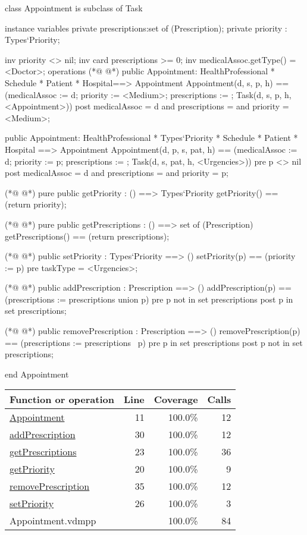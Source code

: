 \begin{vdmpp}[breaklines=true]
class Appointment is subclass of Task

instance variables
  private prescriptions:set of (Prescription);
  private priority : Types`Priority;
  
  inv priority <> nil;
  inv card prescriptions >= 0;
  inv medicalAssoc.getType() = <Doctor>;
operations
(*@
\label{Appointment:11}
@*)
 public Appointment: HealthProfessional * Schedule * Patient * Hospital==> Appointment
  Appointment(d, s, p, h) == (medicalAssoc := d; priority := <Medium>; prescriptions := {}; Task(d, s, p, h, <Appointment>))
 post medicalAssoc = d and prescriptions = {} and priority = <Medium>;
 
 public Appointment: HealthProfessional * Types`Priority * Schedule * Patient * Hospital ==> Appointment
  Appointment(d, p, s, pat, h) == (medicalAssoc := d; priority := p; prescriptions := {}; Task(d, s, pat, h, <Urgencies>))
 pre p <> nil
 post medicalAssoc = d and prescriptions = {} and priority = p;

(*@
\label{getPriority:20}
@*)
 pure public getPriority : () ==> Types`Priority
  getPriority() == (return priority);
 
(*@
\label{getPrescriptions:23}
@*)
  pure public getPrescriptions : () ==> set of (Prescription)
   getPrescriptions() == (return prescriptions);
  
(*@
\label{setPriority:26}
@*)
  public setPriority : Types`Priority ==> ()
   setPriority(p) == (priority := p)
  pre taskType = <Urgencies>;
  
(*@
\label{addPrescription:30}
@*)
  public addPrescription : Prescription ==> ()
   addPrescription(p) == (prescriptions := prescriptions union {p})
  pre p not in set prescriptions
  post p in set prescriptions;
                 
(*@
\label{removePrescription:35}
@*)
 public removePrescription : Prescription ==> ()
   removePrescription(p) == (prescriptions := prescriptions \ {p})
  pre p in set prescriptions
  post p not in set prescriptions;
   
end Appointment
\end{vdmpp}
\bigskip
\begin{longtable}{|l|r|r|r|}
\hline
Function or operation & Line & Coverage & Calls \\
\hline
\hline
\hyperref[Appointment:11]{Appointment} & 11&100.0\% & 12 \\
\hline
\hyperref[addPrescription:30]{addPrescription} & 30&100.0\% & 12 \\
\hline
\hyperref[getPrescriptions:23]{getPrescriptions} & 23&100.0\% & 36 \\
\hline
\hyperref[getPriority:20]{getPriority} & 20&100.0\% & 9 \\
\hline
\hyperref[removePrescription:35]{removePrescription} & 35&100.0\% & 12 \\
\hline
\hyperref[setPriority:26]{setPriority} & 26&100.0\% & 3 \\
\hline
\hline
Appointment.vdmpp & & 100.0\% & 84 \\
\hline
\end{longtable}

